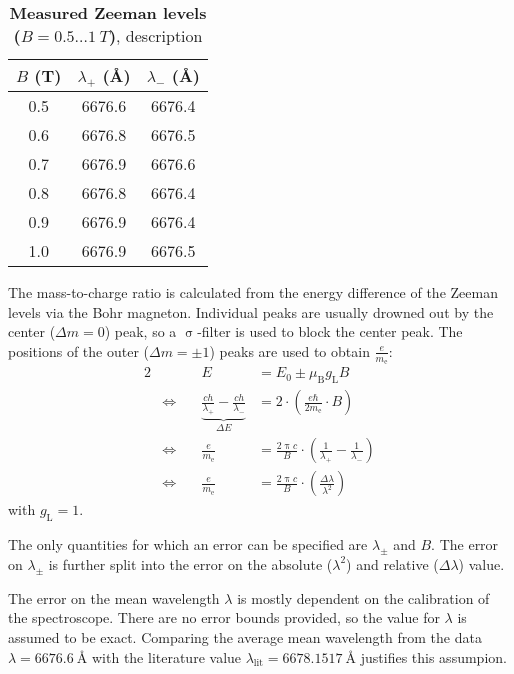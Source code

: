 \begin{table}[tbp]
	\centering
	\caption[Measured Zeeman levels ($B = \num{0.5} \dots \SI{1}{T}$)]{\textbf{Measured Zeeman levels ($B = \num{0.5} \dots \SI{1}{T}$)}, description}
	\label{tab:meas}
	\begin{tabular}{SSS}
		\toprule
		{$B$ (\si{\tesla})}& {$\lambda_+$ (\si{\angstrom})}& {$\lambda_-$ (\si{\angstrom})}\\
		&	6676.6&	6676.4\\
		0.6&	6676.8&	6676.5\\
		0.7&	6676.9&	6676.6\\
		0.8&	6676.8&	6676.4\\
		0.9&	6676.9&	6676.4\\
		1.0&	6676.9&	6676.5\\
		\bottomrule
	\end{tabular}
\end{table}

The mass-to-charge ratio is calculated from the energy difference of the Zeeman levels via the Bohr magneton.
Individual peaks are usually drowned out by the center ($\Delta m = 0$) peak, so a $\upsigma$-filter is used to block the center peak.
The positions of the outer ($\Delta m = \pm 1$) peaks are used to obtain $\frac{e}{m_\text{e}}$:
\begin{alignat}{2}
	& &E &= E_0 \pm \mu_\text{B} g_\text{L} B\\
	&\Leftrightarrow \quad &\underbrace{\frac{c h}{\lambda_+} - \frac{c h}{\lambda_-}}_{\Delta E} &=
	2 \cdot \left(\frac{e \hbar}{2 m_\text{e}} \cdot B \right)\\
	&\Leftrightarrow &\frac{e}{m_\text{e}} &= \frac{2 \uppi c}{B} \cdot \left(\frac{1}{\lambda_+} - \frac{1}{\lambda_-}\right)\\
	&\Leftrightarrow &\frac{e}{m_\text{e}} &= \frac{2 \uppi c}{B} \cdot \left(\frac{\Delta \lambda}{\lambda^2}\right)
\end{alignat}
with $g_\text{L} = 1$.

The only quantities for which an error can be specified are $\lambda_\pm$ and $B$.
The error on $\lambda_\pm$ is further split into the error on the absolute ($\lambda^2$) and relative ($\Delta \lambda$) value.

The error on the mean wavelength $\lambda$ is mostly dependent on the calibration of the spectroscope.
There are no error bounds provided, so the value for $\lambda$ is assumed to be exact. 
Comparing the average mean wavelength from the data $\lambda = \SI{6676.6}{\angstrom}$ with the literature value $\lambda_\text{lit} = \SI{6678.1517}{\angstrom}$ justifies this assumpion.

